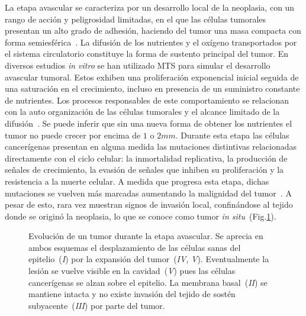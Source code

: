 La etapa avascular se caracteriza por un desarrollo local de la neoplasia, con un rango de acci\'on y peligrosidad limitadas, en el que las c\'elulas tumorales presentan un alto grado de adhesi\'on, haciendo del tumor una masa compacta con forma semiesf\'erica~\cite{ruben,vascular}. La difusi\'on de los nutrientes y el ox\'igeno transportados por el sistema circulatorio constituye la forma de sustento principal del tumor. En diversos estudios \textit{in vitro} se han utilizado MTS para simular el desarrollo avascular tumoral. Estos exhiben una proliferaci\'on exponencial inicial seguida de una saturaci\'on en el crecimiento, incluso en presencia de un suministro constante de nutrientes. Los procesos responsables de este comportamiento se relacionan con la auto organizaci\'on de las c\'elulas tumorales y el alcance limitado de la difusi\'on~\cite{kansal,dormann}. Se puede inferir que sin una nueva forma de obtener los nutrientes el tumor no puede crecer por encima de $1$ o $2mm$. Durante esta etapa las c\'elulas cancer\'igenas presentan en alguna medida las mutaciones distintivas relacionadas directamente con el ciclo celular: la inmortalidad replicativa, la producci\'on de se\~nales de crecimiento, la evasi\'on de se\~nales que inhiben su proliferaci\'on y la resistencia a la muerte celular. A medida que progresa esta etapa, dichas mutaciones se vuelven m\'as marcadas aumentando la malignidad del tumor~\cite{vascular}. A pesar de esto, rara vez muestran signos de invasi\'on local, confin\'andose al tejido donde se origin\'o la neoplasia, lo que se conoce como tumor \textit{in situ}~(Fig.\ref{fig-epitelium-2}).

\begin{figure}[!ht]
\begin{center}
\end{center}\vspace*{-1cm}
\caption[Evoluci\'on de un tumor durante la etapa avascular]{Evoluci\'on de un tumor durante la etapa avascular. Se aprecia en ambos esquemas el desplazamiento de las c\'elulas sanas del epitelio~(\emph{I}) por la expansi\'on del tumor~(\emph{IV}, \emph{V}). Eventualmente la lesi\'on se vuelve visible en la cavidad~(\emph{V}) pues las c\'elulas cancer\'igenas se alzan sobre el epitelio. La membrana basal~(\emph{II}) se mantiene intacta y no existe invasi\'on del tejido de sost\'en subyacente~(\emph{III}) por parte del tumor.}
\label{fig-epitelium-2}
\end{figure}


